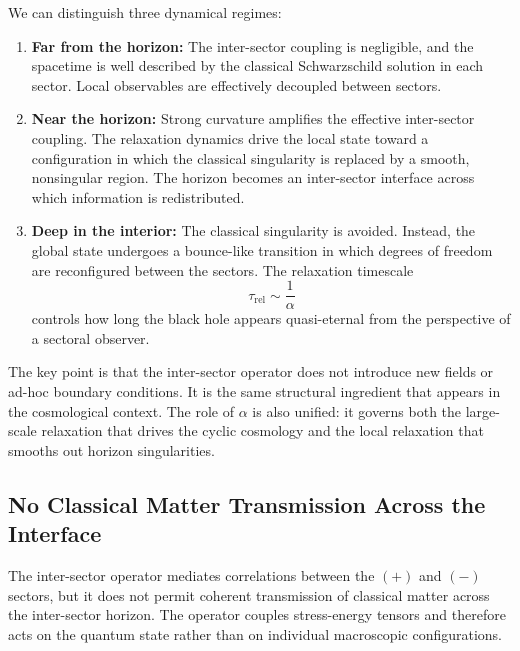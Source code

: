 \documentclass[11pt,a4paper]{article}
\begin{document}
We can distinguish three dynamical regimes:

\begin{enumerate}
\item \textbf{Far from the horizon:}  
The inter-sector coupling is negligible, and the spacetime is well described by the
classical Schwarzschild solution in each sector. Local observables are effectively
decoupled between sectors.

\item \textbf{Near the horizon:}  
Strong curvature amplifies the effective inter-sector coupling. The relaxation dynamics
drive the local state toward a configuration in which the classical singularity is replaced
by a smooth, nonsingular region. The horizon becomes an inter-sector interface across
which information is redistributed.

\item \textbf{Deep in the interior:}  
The classical singularity is avoided. Instead, the global state undergoes a bounce-like
transition in which degrees of freedom are reconfigured between the sectors. The
relaxation timescale
\begin{equation}
\tau_{\mathrm{rel}} \sim \frac{1}{\alpha}
\end{equation}
controls how long the black hole appears quasi-eternal from the perspective of a
sectoral observer.
\end{enumerate}

The key point is that the inter-sector operator does not introduce new fields or ad-hoc
boundary conditions. It is the same structural ingredient that appears in the cosmological
context. The role of $\alpha$ is also unified: it governs both the large-scale relaxation that
drives the cyclic cosmology and the local relaxation that smooths out horizon
singularities.


\subsection{No Classical Matter Transmission Across the Interface}

The inter-sector operator mediates correlations between the $(+)$ and $(-)$ sectors, but
it does not permit coherent transmission of classical matter across the inter-sector
horizon. The operator couples stress-energy tensors and therefore acts on the quantum
state rather than on individual macroscopic configurations.
\end{document}
